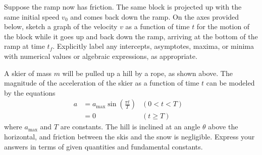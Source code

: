 \documentclass{../../../oss-classkick-exam}
\begin{document}
\begin{questions}
\begin{parts}
  \item Suppose the ramp now has friction. The same block is projected up with
    the same initial speed $v_0$ and comes back down the ramp. On the axes
    provided below, sketch a graph of the velocity $v$ as a function of time $t$
    for the motion of the block while it goes up and back down the ramp,
    arriving at the bottom of the ramp at time $t_f$. Explicitly label any
    intercepts, asymptotes, maxima, or minima with numerical values or
    algebraic expressions, as appropriate.
    \begin{center}
    \end{center}
  \end{parts}
  \newpage
  

  \question A skier of mass $m$ will be pulled up a hill by a rope, as shown
  above. The magnitude of the acceleration of the skier as a function of time
  $t$ can be modeled by the equations
  \begin{align*}
    a &=a_\text{max}\sin\left(\frac{\pi t}{T}\right)  &(0<t<T)&\\
    &=0 & (t\geq T)&
  \end{align*}
  where $a_\text{max}$ and $T$ are constants. The hill is inclined at an angle
  $\theta$ above the horizontal, and friction between the skis and the snow is
  negligible. Express your answers in terms of given quantities and fundamental
  constants.
\end{questions}
\end{document}
